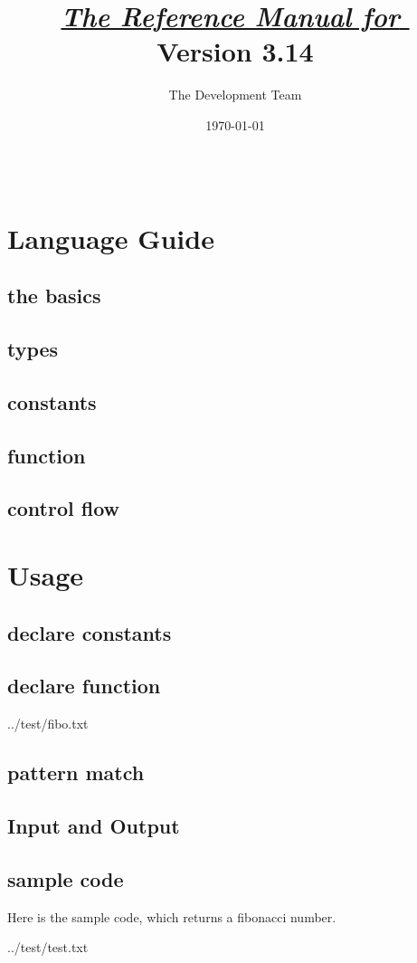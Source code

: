 \documentclass[openany,b5j,11pt,english]{jsbook}
\title{\underline{{\huge $\;\:$\textit{The Reference Manual for} \EL$\;\:$}}\\Version 3.14}
\author{The \EL \;Development Team}
\date{\today}
\begin{document}
\maketitle
\frontmatter
\setcounter{page}{0}
\thispagestyle{empty}
$\;$\\
\newpage
\tableofcontents
\mainmatter
\chapter{Language Guide}
\section{the basics}
\section{types}
\section{constants}
\section{function}
\section{control flow}
\chapter{Usage}
\section{declare constants}
\section{declare function}

{../test/fibo.txt}
\section{pattern match}
\section{Input and Output}
\section{sample code}
Here is the sample code, which returns a fibonacci number.

{../test/test.txt}
\end{document}
